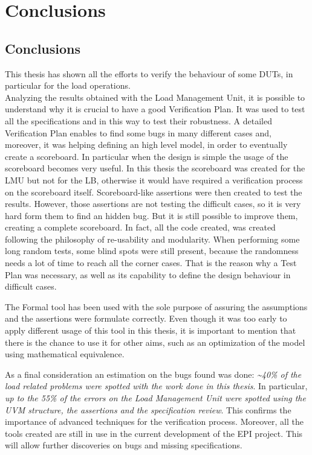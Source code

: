 \chapter{Conclusions}
\section{Conclusions}
This thesis has shown all the efforts to verify the behaviour of some DUTs, in particular for the load operations.\\

Analyzing the results obtained with the Load Management Unit, it is possible to understand why it is crucial to have a good Verification Plan. It was used to test all the specifications and in this way to test their robustness. A detailed Verification Plan enables to find some bugs in many different cases and, moreover, it was helping defining an high level model, in order to eventually create a scoreboard. 
In particular when the design is simple the usage of the scoreboard becomes very useful. In this thesis the scoreboard was created for the LMU but not for the LB, otherwise it would have required a verification process on the scoreboard itself.
Scoreboard-like assertions were then created to test the results. However, those assertions are not testing the difficult cases, so it is very hard form them to find an hidden bug. 
But it is still possible to improve them, creating a complete scoreboard. In fact, all the code created, was created following the philosophy of re-usability and modularity.
When performing some long random tests, some blind spots were still present, because the randomness needs a lot of time to reach all the corner cases. That is the reason why a Test Plan was necessary, as well as its capability to define the design behaviour in difficult cases.

The Formal tool has been used with the sole purpose of assuring the assumptions and the assertions were formulate correctly. Even though it was too early to apply different usage of this tool in this thesis, it is important to mention that there is the chance to use it for other aims, such as an optimization of the model using mathematical equivalence.


As a final consideration an estimation on the bugs found was done:
\emph{\textasciitilde 40\% of the load related problems were spotted with the work done in this thesis}. In particular, \emph{up to the 55\% of the errors on the Load Management Unit were spotted using the UVM structure, the assertions and the specification review}.
This confirms the importance of advanced techniques for the verification process. Moreover, all the tools created are still in use in the current development of the EPI project. This will allow further discoveries on bugs and missing specifications.

